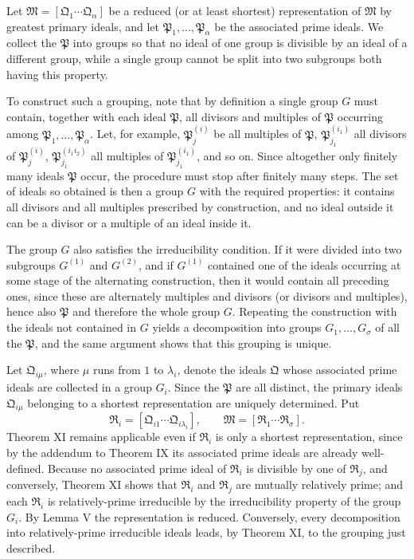 \documentclass[11pt]{article}
\newcommand{\ideal}[1]{\mathfrak{#1}}
\begin{document}
Let $\ideal M=[\ideal Q_1\cdots\ideal Q_\alpha]$ be a reduced (or at least shortest) representation of $\ideal M$ by greatest primary ideals, and let $\ideal P_1,
\ldots,\ideal P_\alpha$ be the associated prime ideals. We collect the $\ideal P$ into groups so that no ideal of one group is divisible by an ideal of a different group, while a single group cannot be split into two subgroups both having this property.

To construct such a grouping, note that by definition a single group $G$ must contain, together with each ideal $\ideal P$, all divisors and multiples of $\ideal P$ occurring among $\ideal P_1,
\ldots,\ideal P_\alpha$. Let, for example, $\ideal P_j^{(i)}$ be all multiples of $\ideal P$, $\ideal P_{j_1}^{(i_1)}$ all divisors of $\ideal P_j^{(i)}$, $\ideal P_{j_1}^{(i_1 i_2)}$ all multiples of $\ideal P_{j_1}^{(i_1)}$, and so on. Since altogether only finitely many ideals $\ideal P$ occur, the procedure must stop after finitely many steps. The set of ideals so obtained is then a group $G$ with the required properties: it contains all divisors and all multiples prescribed by construction, and no ideal outside it can be a divisor or a multiple of an ideal inside it.

The group $G$ also satisfies the irreducibility condition. If it were divided into two subgroups $G^{(1)}$ and $G^{(2)}$, and if $G^{(1)}$ contained one of the ideals occurring at some stage of the alternating construction, then it would contain all preceding ones, since these are alternately multiples and divisors (or divisors and multiples), hence also $\ideal P$ and therefore the whole group $G$. Repeating the construction with the ideals not contained in $G$ yields a decomposition into groups $G_1,
\ldots,G_\sigma$ of all the $\ideal P$, and the same argument shows that this grouping is unique.

Let $\ideal Q_{i\mu}$, where $\mu$ runs from $1$ to $\lambda_i$, denote the ideals $\ideal Q$ whose associated prime ideals are collected in a group $G_i$. Since the $\ideal P$ are all distinct, the primary ideals $\ideal Q_{i\mu}$ belonging to a shortest representation are uniquely determined. Put
\[
 \ideal R_i=[\ideal Q_{i1}\cdots\ideal Q_{i\lambda_i}],
 \qquad
 \ideal M=[\ideal R_1\cdots\ideal R_\sigma].
\]
Theorem XI remains applicable even if $\ideal R_i$ is only a shortest representation, since by the addendum to Theorem IX its associated prime ideals are already well-defined. Because no associated prime ideal of $\ideal R_i$ is divisible by one of $\ideal R_j$, and conversely, Theorem XI shows that $\ideal R_i$ and $\ideal R_j$ are mutually relatively prime; and each $\ideal R_i$ is relatively-prime irreducible by the irreducibility property of the group $G_i$. By Lemma V the representation is reduced. Conversely, every decomposition into relatively-prime irreducible ideals leads, by Theorem XI, to the grouping just described.
\end{document}
